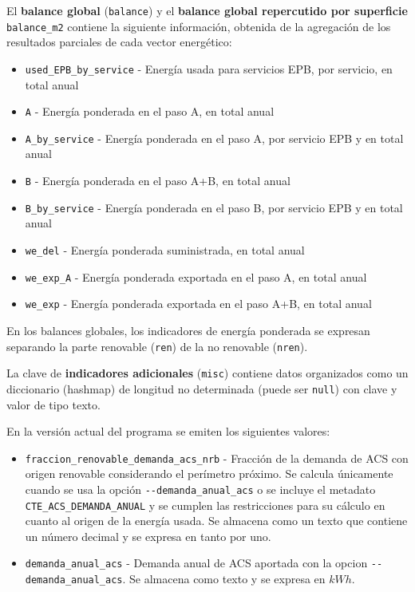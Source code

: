 \documentclass[10pt,notitlepage,oneside,a4paper]{article}
\begin{document}
El \textbf{balance global} (\texttt{balance}) y el \textbf{balance global repercutido por superficie} \texttt{balance\_m2} contiene la siguiente información, obtenida de la agregación de los resultados parciales de cada vector energético:

\begin{itemize}
\item \texttt{used\_EPB\_by\_service} - Energía usada para servicios EPB, por servicio, en total anual
\item \texttt{A} - Energía ponderada en el paso A, en total anual
\item \texttt{A\_by\_service} - Energía ponderada en el paso A, por servicio EPB y en total anual
\item \texttt{B} - Energía ponderada en el paso A+B, en total anual
\item \texttt{B\_by\_service} - Energía ponderada en el paso B, por servicio EPB y en total anual
\item \texttt{we\_del} - Energía ponderada suministrada, en total anual
\item \texttt{we\_exp\_A} - Energía ponderada exportada en el paso A, en total anual
\item \texttt{we\_exp} - Energía ponderada exportada en el paso A+B, en total anual
\end{itemize}

En los balances globales, los indicadores de energía ponderada se expresan separando la parte renovable (\texttt{ren}) de la no renovable (\texttt{nren}).

La clave de \textbf{indicadores adicionales} (\texttt{misc}) contiene datos organizados como un diccionario (hashmap) de longitud no determinada (puede ser \texttt{null}) con clave y valor de tipo texto.

En la versión actual del programa se emiten los siguientes valores:

\begin{itemize}
\item \texttt{fraccion\_renovable\_demanda\_acs\_nrb} - Fracción de la demanda de ACS con origen renovable considerando el perímetro próximo. Se calcula únicamente cuando se usa la opción \texttt{-{}-demanda\_anual\_acs} o se incluye el metadato \texttt{CTE\_ACS\_DEMANDA\_ANUAL} y se cumplen las restricciones para su cálculo en cuanto al origen de la energía usada. Se almacena como un texto que contiene un número decimal y se expresa en tanto por uno.
\item \texttt{demanda\_anual\_acs} - Demanda anual de ACS aportada con la opcion \texttt{-{}-demanda\_anual\_acs}. Se almacena como texto y se expresa en $kWh$.
\end{itemize}
\end{document}
